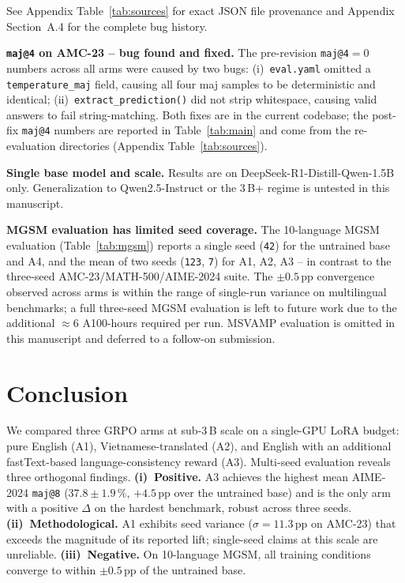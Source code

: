 \documentclass[journal,onecolumn,11pt]{IEEEtran}
\newcommand{\armA}{\textsc{A1}}
\newcommand{\armB}{\textsc{A2}}
\newcommand{\armC}{\textsc{A3}}
\newcommand{\armD}{\textsc{A4}}
\begin{document}
See Appendix Table~\ref{tab:sources} for exact JSON file provenance and
Appendix Section~A.4 for the complete bug history.

\textbf{\texttt{maj@4} on AMC-23 -- bug found and fixed.} The pre-revision
\texttt{maj@4}$=0$ numbers across all arms were caused by two bugs:
(i)~\texttt{eval.yaml} omitted a \texttt{temperature\_maj} field, causing
all four maj samples to be deterministic and identical;
(ii)~\texttt{extract\_prediction()} did not strip whitespace, causing valid
answers to fail string-matching. Both fixes are in the current codebase; the post-fix \texttt{maj@4} numbers
are reported in Table~\ref{tab:main} and come from the
 re-evaluation directories (Appendix
Table~\ref{tab:sources}).

\textbf{Single base model and scale.} Results are on
DeepSeek-R1-Distill-Qwen-1.5B only. Generalization to Qwen2.5-Instruct or
the 3\,B+ regime is untested in this manuscript.

\textbf{MGSM evaluation has limited seed coverage.} The 10-language
MGSM evaluation (Table~\ref{tab:mgsm}) reports a single seed
(\texttt{42}) for the untrained base and \armD{}, and the mean of two
seeds (\texttt{123}, \texttt{7}) for \armA{}, \armB{}, \armC{} -- in
contrast to the three-seed AMC-23/MATH-500/AIME-2024 suite. The
$\pm 0.5$\,pp convergence observed across arms is within the range of
single-run variance on multilingual benchmarks; a full three-seed MGSM
evaluation is left to future work due to the additional $\approx 6$
A100-hours required per run. MSVAMP evaluation is omitted in this
manuscript and deferred to a follow-on submission.

\section{Conclusion}
\label{sec:conclusion}

We compared three GRPO arms at sub-3\,B scale on a single-GPU LoRA
budget: pure English (\armA{}), Vietnamese-translated (\armB{}), and
English with an additional fastText-based language-consistency reward
(\armC{}). Multi-seed evaluation reveals three orthogonal findings.
\textbf{(i)~Positive.} \armC{} achieves the highest mean AIME-2024
\texttt{maj@8} ($37.8 \pm 1.9$\,\%, $+4.5$\,pp over the untrained base)
and is the only arm with a positive $\Delta$ on the hardest benchmark,
robust across three seeds.
\textbf{(ii)~Methodological.} \armA{} exhibits seed variance
($\sigma{=}11.3$\,pp on AMC-23) that exceeds the magnitude of its
reported lift; single-seed claims at this scale are unreliable.
\textbf{(iii)~Negative.} On 10-language MGSM, all training conditions
converge to within $\pm 0.5$\,pp of the untrained base.
\end{document}
